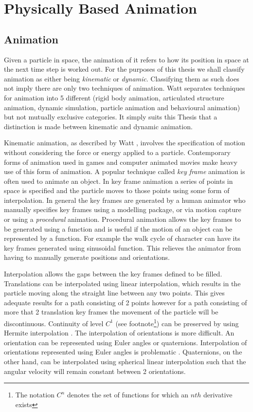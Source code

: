 \chapter{Physically Based Animation}
\section{Animation}
Given a particle in space, the animation of it refers to how its position in
space at the next time step is worked out. For the purposes of this thesis we
shall classify animation as either being \textit{kinematic} or \textit{dynamic}.
Classifying them as such does not imply there are only two
techniques of animation. Watt \cite{Watt} separates techniques for
animation into 5 different (rigid body animation, articulated structure
animation, dynamic simulation, particle animation and behavioural animation) but
not mutually exclusive categories. It simply suits this Thesis that a
distinction is made between kinematic and dynamic animation. 

Kinematic animation, as described by Watt \cite{Watt}, involves the
specification of motion without considering the force or energy applied to a
particle. Contemporary forms of animation used in games \cite{Eberly,
MollerHaines, Watt} and computer animated movies \cite{Watt} make heavy use of
this form of animation. A popular technique called \textit{key frame} animation
is often used to animate an object. In key frame animation a series of points in
space is specified and the particle moves to those points using some form of
interpolation. In general the key frames are generated by a human animator who
manually specifies key frames using a modelling package, or via motion capture
or using a \textit{procedural} animation. Procedural animation allows the key frames to be
generated using a function and is useful if the motion of an object can be
represented by a function. For example the walk cycle of character can have its
key frames generated using sinusoidal function. This relieves the animator from
having to manually generate positions and orientations.

Interpolation allows the gaps between the key frames defined to be filled.
Translations can be interpolated using linear interpolation, which results in
the particle moving along the straight line between any two points. This 
gives adequate results for a path consisting of 2 points however for a path
consisting of more that 2 translation key frames the movement of the particle
will be discontinuous. Continuity of level $C^1$ (see footnote\footnote{The
notation $C^n$ denotes the set of functions for which an $nth$ derivative
exists}) can be preserved by using Hermite interpolation \cite{MollerHaines}.
The interpolation of orientations is more difficult. An orientation can be
represented using Euler angles or quaternions. Interpolation of orientations
represented using Euler angles is problematic \cite{Watt}. Quaternions, on the
other hand, can be interpolated using spherical linear interpolation
\cite{Shoemake} such that the angular velocity will remain constant between 2
orientations. 

